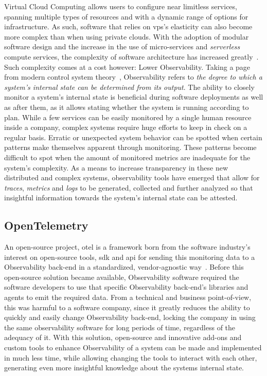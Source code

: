 Virtual Cloud Computing allows users to configure near limitless services, spanning multiple types of resources and with a dynamic range of options for infrastructure. As such, software that relies on \gls{vps}'s elasticity can also become more complex than when using private clouds. With the adoption of modular software design and the increase in the use of micro-services and \textit{serverless} compute services, the complexity of software architecture has increased greatly~\Parencite{niedermaier_koetter_freymann_wagner_2019}.
Such complexity comes at a cost however: Lower Observability. Taking a page from modern control system theory~\Parencite{gopal1993modern}, Observability refers to \textit{the degree to which a system's internal state can be determined from its output}. 
The ability to closely monitor a system's internal state is beneficial during software deployments as well as after them, as it allows stating whether the system is running according to plan.
While a few services can be easily monitored by a single human resource inside a company, complex systems require huge efforts to keep in check on a regular basis. 
Erratic or unexpected system behavior can be spotted when certain patterns make themselves apparent through monitoring. These patterns become difficult to spot when the amount of monitored metrics are inadequate for the system's complexity.
As a means to increase transparency in these new distributed and complex systems, observability tools have emerged that allow for \textit{traces}, \textit{metrics} and \textit{logs} to be generated, collected and further analyzed so that insightful information towards the system's internal state can be attested.

\subsection{OpenTelemetry}\label{state-of-the-art:ss:opentelemetry}

An open-source project, \gls{otel} is a framework born from the software industry's interest on open-source tools, \gls{sdk} and \gls{api} for sending this monitoring data to a Observability back-end in a standardized, vendor-agnostic way~\Parencite{observability_primer_2022}. Before this open-source solution became available, Observability software required the software developers to use that specific Observability back-end's libraries and agents to emit the required data. From a technical and business point-of-view, this was harmful to a software company, since it greatly reduces the ability to quickly and easily change Observability back-end, locking the company in using the same observability software for long periods of time, regardless of the adequacy of it.
With this solution, open-source and innovative add-ons and custom tools to enhance Observability of a system can be made and implemented in much less time, while allowing changing the tools to interact with each other, generating even more insightful knowledge about the systems internal state.

